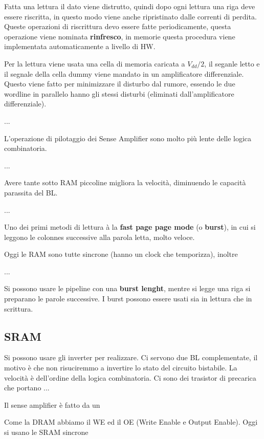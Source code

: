 \documentclass[12pt]{article}
\begin{document}

Fatta una lettura il dato viene distrutto, quindi dopo ogni lettura una riga deve essere riscritta, in questo modo viene anche ripristinato dalle correnti di perdita. Queste operazioni di riscrittura devo essere fatte periodicamente, questa operazione viene nominata \textbf{rinfresco}, in memorie questa procedura viene implementata automaticamente a livello di HW.

Per la lettura viene usata una cella di memoria caricata a $V _{dd}/2$, il seganle letto e il segnale della cella dummy viene mandato in un amplificatore differenziale. Questo viene fatto per minimizzare il disturbo dal rumore, essendo le due wordline in parallelo hanno gli stessi disturbi (eliminati dall'amplificatore differenziale).

...

L'operazione di pilotaggio dei Sense Amplifier sono molto pi\`u lente delle logica combinatoria. 

...

Avere tante sotto RAM piccoline migliora la velocit\`a, diminuendo le capacit\`a parassita del BL.

...

Uno dei primi metodi di lettura \`a la \textbf{fast page page mode} (o \textbf{burst}), in cui si leggono le colonnes successive alla parola letta, molto veloce.

Oggi le RAM sono tutte sincrone (hanno un clock che temporizza), inoltre 

...

Si possono usare le pipeline con una \textbf{burst lenght}, mentre si legge una riga si preparano le parole successive. I burst possono essere usati sia in lettura che in scrittura.


\subsection{SRAM}
Si possono usare gli inverter per realizzare. Ci servono due BL complementate, il motivo \`e che non risuciremmo a invertire lo stato del circuito bistabile. La velocit\`a \`e dell'ordine della logica combinatoria. Ci sono dei trasistor di precarica che portano ...

Il sense amplifier \`e fatto da un

Come la DRAM abbiamo il WE ed il OE (Write Enable e Output Enable). Oggi si usano le SRAM sincrone 
\end{document}
